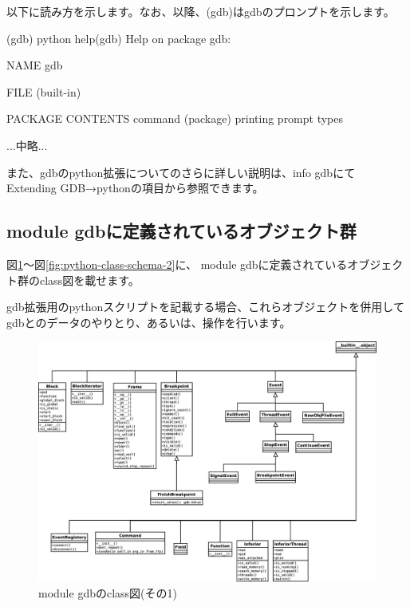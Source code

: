 \documentclass[mingoth,a4paper]{jsarticle}
\begin{document}
 以下に読み方を示します。なお、以降、(gdb)はgdbのプロンプトを示します。

\begin{commandline}
(gdb) python help(gdb)
Help on package gdb:

NAME
    gdb

FILE
    (built-in)

PACKAGE CONTENTS
    command (package)
    printing
    prompt
    types

...中略...
\end{commandline}

 また、gdbのpython拡張についてのさらに詳しい説明は、info gdbにて
Extending GDB→pythonの項目から参照できます。

\subsection{module gdbに定義されているオブジェクト群}

 図\ref{fig:python-class-schema-1}〜図\ref{fig:python-class-schema-2}に、
module gdbに定義されているオブジェクト群のclass図を載せます。

 gdb拡張用のpythonスクリプトを記載する場合、これらオブジェクトを併用して
gdbとのデータのやりとり、あるいは、操作を行います。

\begin{figure}[h]
\begin{center}
 \includegraphics[width=0.8\hsize]{image201301/gdb-python/gdb-python-class-schema-1.eps}
 \caption{module gdbのclass図(その1)}
 \label{fig:python-class-schema-1}
\end{center}
\end{figure}
\end{document}
